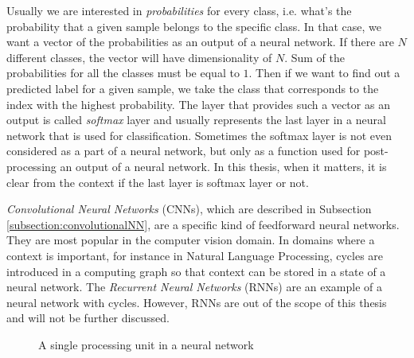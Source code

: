 Usually we are interested in \textit{probabilities} for every class, i.e. what's the probability that a given sample belongs to the specific class. In that case, we want a vector of the probabilities as an output of a neural network. If there are $N$ different classes, the vector will have dimensionality of $N$. Sum of the probabilities for all the classes must be equal to $1$. Then if we want to find out a predicted label for a given sample, we take the class that corresponds to the index with the highest probability. The layer that provides such a vector as an output is called \textit{softmax} layer and usually represents the last layer in a neural network that is used for classification. Sometimes the softmax layer is not even considered as a part of a neural network, but only as a function used for post-processing an output of a neural network. In this thesis, when it matters, it is clear from the context if the last layer is softmax layer or not.

 \textit{Convolutional Neural Networks} (CNNs), which are described in Subsection \ref{subsection:convolutionalNN}, are a specific kind of feedforward neural networks. They are most popular in the computer vision domain. In domains where a context is important, for instance in Natural Language Processing, cycles are introduced in a computing graph so that context can be stored in a state of a neural network.  The \textit{Recurrent Neural Networks} (RNNs) are an example of a neural network with cycles. However, RNNs are out of the scope of this thesis and will not be further discussed.

\begin{figure}
\caption{A single processing unit in a neural network}
\label{fig:basic-neuron}
\end{figure}
